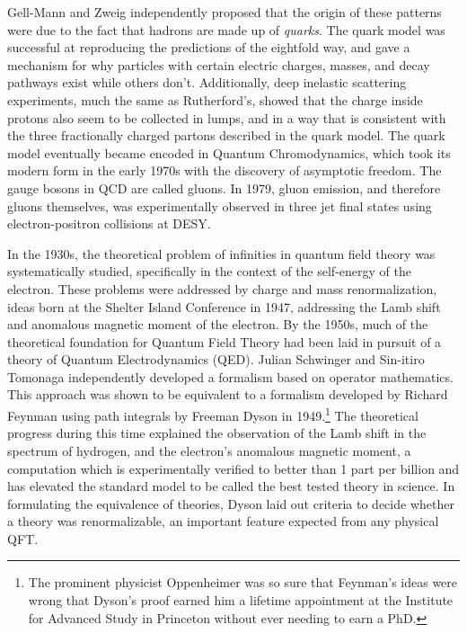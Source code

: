     Gell-Mann and Zweig independently proposed that the origin of these patterns were due to the fact that hadrons are made up of \emph{quarks}. The quark model was successful at reproducing the predictions of the eightfold way, and gave a mechanism for why particles with certain electric charges, masses, and decay pathways exist while others don't. Additionally, deep inelastic scattering experiments, much the same as Rutherford's, showed that the charge inside protons also seem to be collected in lumps, and in a way that is consistent with the three fractionally charged partons described in the quark model. \cite{proton_structure} The quark model eventually became encoded in Quantum Chromodynamics, which took its modern form in the early 1970s with the discovery of asymptotic freedom. The gauge bosons in QCD are called gluons. In 1979, gluon emission, and therefore gluons themselves, was experimentally observed in three jet final states using electron-positron collisions at DESY. \cite{ellis_gluon}

    In the 1930s, the theoretical problem of infinities in quantum field theory was systematically studied, specifically in the context of the self-energy of the electron. These problems were addressed by charge and mass renormalization, ideas born at the Shelter Island Conference in 1947, addressing the Lamb shift and anomalous magnetic moment of the electron. By the 1950s, much of the theoretical foundation for Quantum Field Theory had been laid in pursuit of a theory of Quantum Electrodynamics (QED). Julian Schwinger and Sin-itiro Tomonaga independently developed a formalism based on operator mathematics. This approach was shown to be equivalent to a formalism developed by Richard Feynman using path integrals by Freeman Dyson in 1949.\footnote{The prominent physicist Oppenheimer was so sure that Feynman's ideas were wrong that Dyson's proof earned him a lifetime appointment at the Institute for Advanced Study in Princeton without ever needing to earn a PhD.} The theoretical progress during this time explained the observation of the Lamb shift in the spectrum of hydrogen, and the electron's anomalous magnetic moment, a computation which is experimentally verified to better than 1 part per billion and has elevated the standard model to be called the best tested theory in science. In formulating the equivalence of theories, Dyson laid out criteria to decide whether a theory was renormalizable, an important feature expected from any physical QFT.

